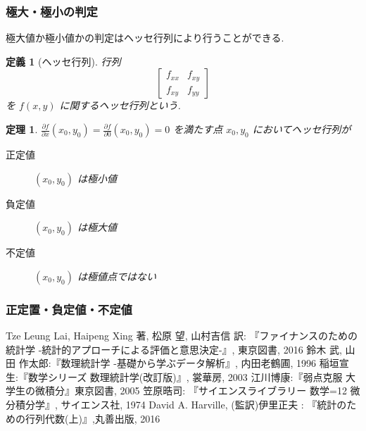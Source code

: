 \documentclass{jsarticle}
\theoremstyle{plain}
\newtheorem{theo}{定理}[section]
\newtheorem{defi}{定義}[section]
\begin{document}

  \subsubsection{極大・極小の判定}
  極大値か極小値かの判定はヘッセ行列により行うことができる.

  \begin{defi}[ヘッセ行列]
    行列
    \begin{equation*}
      \left[
        \begin{array}{cc}
          f_{xx} & f_{xy} \\
          f_{xy} & f_{yy}
        \end{array}
      \right]
    \end{equation*}
    を $f(x, y)$ に関するヘッセ行列という.
  \end{defi}

  \begin{theo}
    $\frac{\partial f}{\partial x}(x_0, y_0) = \frac{\partial f}{\partial 0}(x_0, y_0) = 0$ を満たす点 $x_0, y_0$ においてヘッセ行列が\footnotemark
    \begin{description}
      \item[正定値] $(x_0, y_0)$ は極小値
      \item[負定値] $(x_0, y_0)$ は極大値
      \item[不定値] $(x_0, y_0)$ は極値点ではない
    \end{description}
  \end{theo}

  \subsubsection{正定置・負定値・不定値}


  \begin{thebibliography}{9}
     Tze Leung Lai, Haipeng Xing 著, 松原 望, 山村吉信 訳: 『ファイナンスのための統計学 -統計的アプローチによる評価と意思決定-』, 東京図書, 2016
     鈴木 武, 山田 作太郎:『数理統計学 -基礎から学ぶデータ解析』, 内田老鶴圃, 1996
     稲垣宣生:『数学シリーズ 数理統計学(改訂版)』, 裳華房, 2003
     江川博康:『弱点克服 大学生の微積分』東京図書, 2005
     笠原晧司: 『サイエンスライブラリー 数学=12 微分積分学』, サイエンス社, 1974
     David A. Harville, (監訳)伊里正夫 : 『統計のための行列代数(上)』,丸善出版, 2016
  \end{thebibliography}
\end{document}
